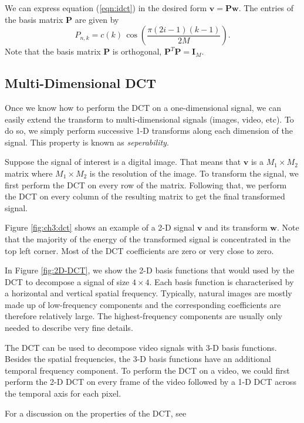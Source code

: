 We can express equation (\ref{eqn:idct}) in the desired form $\bm v=\bm P\bm w$.
The entries of the basis matrix $\bm P$ are given by
\begin{equation}
  P_{n,k} = c(k)\, \cos\left(\frac{\pi(2i-1)(k-1)}{2M}\right).
\end{equation}
Note that the basis matrix $\bm P$ is orthogonal, $\bm P^T\bm P=\bm I_M$.

\subsection{Multi-Dimensional DCT}
Once we know how to perform the DCT on a one-dimensional signal, we can easily extend the transform to multi-dimensional signals (images, video, etc).
To do so, we simply perform successive 1-D transforms along each dimension of the signal.
This property is known as \emph{seperability}.

Suppose the signal of interest is a digital image.
That means that $\bm v$ is a $M_1\times M_2$ matrix where $M_1\times M_2$ is the resolution of the image.
To transform the signal, we first perform the DCT on every row of the matrix.
Following that, we perform the DCT on every column of the resulting matrix to get the final transformed signal.

Figure \ref{fig:ch3:dct} shows an example of a 2-D signal $\bm v$ and its transform $\bm w$.
Note that the majority of the energy of the transformed signal is concentrated in the top left corner.
Most of the DCT coefficients are zero or very close to zero.

In Figure \ref{fig:2D-DCT}, we show the 2-D basis functions that would used by the DCT to decompose a signal of size $4\times 4$.
Each basis function is characterised by a horizontal and vertical spatial frequency.
Typically, natural images are mostly made up of low-frequency components and the corresponding coefficients are therefore relatively large.
The highest-frequency components are usually only needed to describe very fine details.

The DCT can be used to decompose video signals with 3-D basis functions. 
Besides the spatial frequencies, the 3-D basis functions have an additional temporal frequency component.
To perform the DCT on a video, we could first perform the 2-D DCT on every frame of the video followed by a 1-D DCT across the temporal axis for each pixel.

For a discussion on the properties of the DCT, see \cite{khayam2003}


